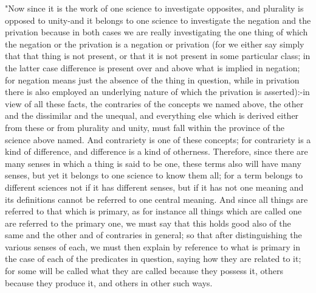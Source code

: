 "Now since it is the work of one science to investigate opposites,
and plurality is opposed to unity-and it belongs to one science to
investigate the negation and the privation because in both cases we
are really investigating the one thing of which the negation or the
privation is a negation or privation (for we either say simply that
that thing is not present, or that it is not present in some particular
class; in the latter case difference is present over and above what
is implied in negation; for negation means just the absence of the
thing in question, while in privation there is also employed an underlying
nature of which the privation is asserted):-in view of all these facts,
the contraries of the concepts we named above, the other and the dissimilar
and the unequal, and everything else which is derived either from
these or from plurality and unity, must fall within the province of
the science above named. And contrariety is one of these concepts;
for contrariety is a kind of difference, and difference is a kind
of otherness. Therefore, since there are many senses in which a thing
is said to be one, these terms also will have many senses, but yet
it belongs to one science to know them all; for a term belongs to
different sciences not if it has different senses, but if it has not
one meaning and its definitions cannot be referred to one central
meaning. And since all things are referred to that which is primary,
as for instance all things which are called one are referred to the
primary one, we must say that this holds good also of the same and
the other and of contraries in general; so that after distinguishing
the various senses of each, we must then explain by reference to what
is primary in the case of each of the predicates in question, saying
how they are related to it; for some will be called what they are
called because they possess it, others because they produce it, and
others in other such ways. 

